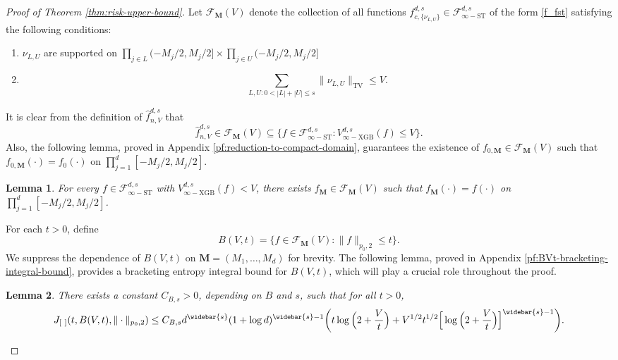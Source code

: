 \documentclass[10pt]{article}
\newtheorem{lemma}{Lemma}
\newcommand{\F}{{\mathcal{F}}}
\newcommand{\fstinf}{{\mathcal{F}^{d, s}_{\infty-\text{ST}}}}
\newcommand{\vinfxgb}{{V^{d, s}_{\infty-\text{XGB}}}}
\newcommand{\lsefstinf}{{\hat{f}^{d, s}_{n, V}}}
\newcommand{\fcnu}{{f^{d, s}_{c, \{\nu_{L, U}\}}}}
\newcommand{\Mbf}{{\mathbf{M}}}
\begin{document}
\begin{proof}[Proof of Theorem \ref{thm:risk-upper-bound}]
Let $\F_{\Mbf}(V)$ denote the collection of all functions 
$\fcnu \in \fstinf$ of the form 
\eqref{f_fst} satisfying the following conditions:
\begin{enumerate}[label = (\alph*)]
\item $\nu_{L, U}$ are supported on 
$\prod_{j \in L} (-M_j/2, M_j/2] \times \prod_{j \in U} (-M_j/2, M_j/2]$
\item
\begin{equation*}
    \sum_{L, U: 0 < |L| + |U| \le s} \|\nu_{L, U}\|_{\text{TV}} 
    \le V.
\end{equation*}
\end{enumerate}
It is clear from the definition of $\lsefstinf$ that
\begin{equation*}
    \lsefstinf \in \F_{\Mbf}(V) \subseteq \{f \in \fstinf: \vinfxgb(f) \le V\}.
\end{equation*}
Also, the following lemma, proved in 
Appendix \ref{pf:reduction-to-compact-domain}, guarantees the existence of 
$f_{0, \Mbf} \in \F_{\Mbf}(V)$ such that $f_{0, \Mbf}(\cdot) = f_0(\cdot)$ on 
$\prod_{j = 1}^{d} [-M_j/2, M_j/2]$. 
    
\begin{lemma}\label{lem:reduction-to-compact-domain}
    For every $f \in \fstinf$ with $\vinfxgb(f) < V$, there exists 
    $f_{\Mbf} \in \F_{\Mbf}(V)$ such that $f_{\Mbf}(\cdot) = f(\cdot)$ on 
    $\prod_{j = 1}^{d} [-M_j/2, M_j/2]$.
\end{lemma}
    
For each $t > 0$, define 
\begin{equation*}
    B(V, t) = \{f \in \F_{\Mbf}(V): \|f\|_{p_0, 2} \le t\}.
\end{equation*}
We suppress the dependence of $B(V, t)$ on 
${\Mbf} = (M_1, \dots, M_d)$ for brevity. The following lemma, 
proved in Appendix \ref{pf:BVt-bracketing-integral-bound}, 
provides a bracketing entropy integral bound for $B(V, t)$, 
which will play a crucial role throughout the proof.
\begin{lemma}\label{lem:BVt-bracketing-integral-bound}
    There exists a constant $C_{B, s} > 0$, 
    depending on $B$ and $s$, such that for all $t > 0$,
    \begin{equation*}
        J_{[ \ ]}(t, B(V, t), \| \cdot \|_{p_0, 2}) 
        \le C_{B, s} d^{\widebar{s}}(1 + \log d)^{\widebar{s} - 1} 
        \bigg(t \log\Big(2 + \frac{V}{t}\Big) + V^{1/2}t^{1/2} 
        \Big[\log\Big(2 + \frac{V}{t}\Big)\Big]^{\widebar{s} - 1}\bigg).
    \end{equation*}
\end{lemma}
    

\end{proof}
\end{document}
